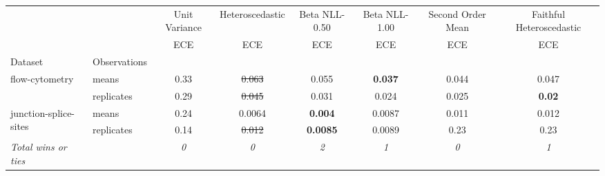 \begin{tabular}{ll|c|c|c|c|c|c}
\toprule
{} & {} & {Unit Variance} & {Heteroscedastic} & {Beta NLL-0.50} & {Beta NLL-1.00} & {Second Order Mean} & {Faithful Heteroscedastic} \\
{} & {} & {ECE} & {ECE} & {ECE} & {ECE} & {ECE} & {ECE} \\
{Dataset} & {Observations} & {} & {} & {} & {} & {} & {} \\
\midrule
\multirow[t]{2}{*}{flow-cytometry} & means & 0.33 & \sout{0.063} & 0.055 & \textbf{0.037} & 0.044 & 0.047 \\
 & replicates & 0.29 & \sout{0.045} & 0.031 & 0.024 & 0.025 & \textbf{0.02} \\
\multirow[t]{2}{*}{junction-splice-sites} & means & 0.24 & 0.0064 & \textbf{0.004} & 0.0087 & 0.011 & 0.012 \\
 & replicates & 0.14 & \sout{0.012} & \textbf{0.0085} & 0.0089 & 0.23 & 0.23 \\
\textit{{Total wins or ties}} &  & \textit{0} & \textit{0} & \textit{2} & \textit{1} & \textit{0} & \textit{1} \\
\bottomrule
\end{tabular}
